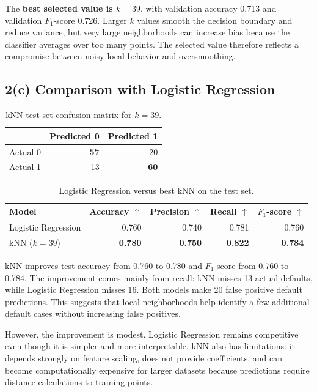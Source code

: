 \documentclass[12pt]{article}
\newcommand{\best}[1]{\textbf{#1}}
\begin{document}
The \textbf{best selected value is $k=39$}, with validation accuracy 0.713 and validation $F_1$-score 0.726. Larger $k$ values smooth the decision boundary and reduce variance, but very large neighborhoods can increase bias because the classifier averages over too many points. The selected value therefore reflects a compromise between noisy local behavior and oversmoothing.

\subsection{2(c) Comparison with Logistic Regression}

\begin{table}[htbp]
\centering
\caption{kNN test-set confusion matrix for $k=39$.}
\begin{tabular}{lrr}
\toprule
 & Predicted 0 & Predicted 1 \\
\midrule
Actual 0 & \best{57} & 20 \\
Actual 1 & 13 & \best{60} \\
\bottomrule
\end{tabular}
\end{table}

\begin{table}[htbp]
\centering
\caption{Logistic Regression versus best kNN on the test set.}
\begin{tabular}{lrrrr}
\toprule
Model & Accuracy $\uparrow$ & Precision $\uparrow$ & Recall $\uparrow$ & $F_1$-score $\uparrow$ \\
\midrule
Logistic Regression & 0.760 & 0.740 & 0.781 & 0.760 \\
kNN ($k=39$) & \best{0.780} & \best{0.750} & \best{0.822} & \best{0.784} \\
\bottomrule
\end{tabular}
\end{table}

kNN improves test accuracy from 0.760 to 0.780 and $F_1$-score from 0.760 to 0.784. The improvement comes mainly from recall: kNN misses 13 actual defaults, while Logistic Regression misses 16. Both models make 20 false positive default predictions. This suggests that local neighborhoods help identify a few additional default cases without increasing false positives.

However, the improvement is modest. Logistic Regression remains competitive even though it is simpler and more interpretable. kNN also has limitations: it depends strongly on feature scaling, does not provide coefficients, and can become computationally expensive for larger datasets because predictions require distance calculations to training points.
\end{document}
